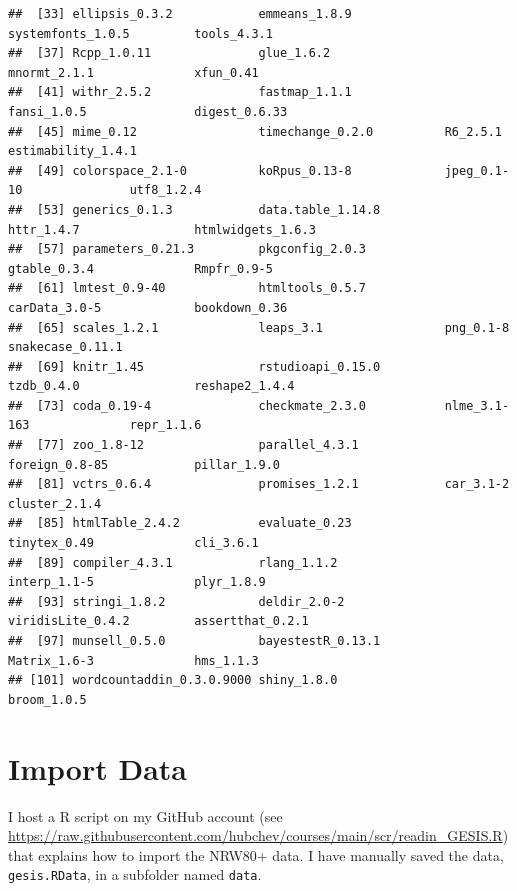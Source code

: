 \documentclass[
  doc]{apa6}
\begin{document}
\begin{verbatim}
##  [33] ellipsis_0.3.2            emmeans_1.8.9             systemfonts_1.0.5         tools_4.3.1              
##  [37] Rcpp_1.0.11               glue_1.6.2                mnormt_2.1.1              xfun_0.41                
##  [41] withr_2.5.2               fastmap_1.1.1             fansi_1.0.5               digest_0.6.33            
##  [45] mime_0.12                 timechange_0.2.0          R6_2.5.1                  estimability_1.4.1       
##  [49] colorspace_2.1-0          koRpus_0.13-8             jpeg_0.1-10               utf8_1.2.4               
##  [53] generics_0.1.3            data.table_1.14.8         httr_1.4.7                htmlwidgets_1.6.3        
##  [57] parameters_0.21.3         pkgconfig_2.0.3           gtable_0.3.4              Rmpfr_0.9-5              
##  [61] lmtest_0.9-40             htmltools_0.5.7           carData_3.0-5             bookdown_0.36            
##  [65] scales_1.2.1              leaps_3.1                 png_0.1-8                 snakecase_0.11.1         
##  [69] knitr_1.45                rstudioapi_0.15.0         tzdb_0.4.0                reshape2_1.4.4           
##  [73] coda_0.19-4               checkmate_2.3.0           nlme_3.1-163              repr_1.1.6               
##  [77] zoo_1.8-12                parallel_4.3.1            foreign_0.8-85            pillar_1.9.0             
##  [81] vctrs_0.6.4               promises_1.2.1            car_3.1-2                 cluster_2.1.4            
##  [85] htmlTable_2.4.2           evaluate_0.23             tinytex_0.49              cli_3.6.1                
##  [89] compiler_4.3.1            rlang_1.1.2               interp_1.1-5              plyr_1.8.9               
##  [93] stringi_1.8.2             deldir_2.0-2              viridisLite_0.4.2         assertthat_0.2.1         
##  [97] munsell_0.5.0             bayestestR_0.13.1         Matrix_1.6-3              hms_1.1.3                
## [101] wordcountaddin_0.3.0.9000 shiny_1.8.0               broom_1.0.5
\end{verbatim}

\hypertarget{import-data}{%
\section{Import Data}\label{import-data}}

I host a R script on my GitHub account (see \url{https://raw.githubusercontent.com/hubchev/courses/main/scr/readin_GESIS.R}) that explains how to import the NRW80+ data. I have manually saved the data, \texttt{gesis.RData}, in a subfolder named \texttt{data}.
\end{document}

